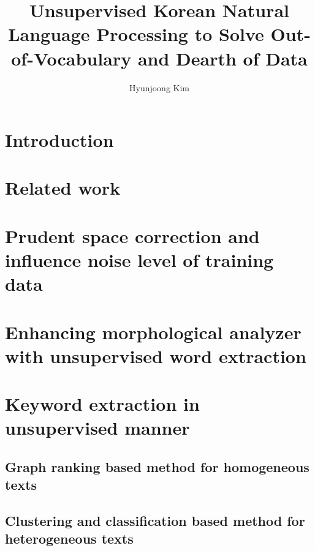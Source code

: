 \documentclass[11pt]{article}
\begin{document}
\title{Unsupervised Korean Natural Language Processing to Solve Out-of-Vocabulary and Dearth of Data}
\author{Hyunjoong Kim}

\maketitle
\smallskip

\section{Introduction}




\section{Related work}



\section{Prudent space correction and influence noise level of training data}




\section{Enhancing morphological analyzer with unsupervised word extraction}



\section{Keyword extraction in unsupervised manner}


\subsection{Graph ranking based method for homogeneous texts}



\subsection{Clustering and classification based method for heterogeneous texts}




\end{document}
